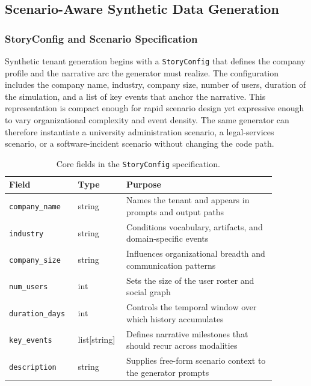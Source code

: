 \subsection{Scenario-Aware Synthetic Data Generation}
\label{sec:method_generation}

\subsubsection{StoryConfig and Scenario Specification}

Synthetic tenant generation begins with a \texttt{StoryConfig} that defines the company profile and the narrative arc the generator must realize. The configuration includes the company name, industry, company size, number of users, duration of the simulation, and a list of key events that anchor the narrative. This representation is compact enough for rapid scenario design yet expressive enough to vary organizational complexity and event density. The same generator can therefore instantiate a university administration scenario, a legal-services scenario, or a software-incident scenario without changing the code path.

\begin{table}[t]
\centering
\caption{Core fields in the \texttt{StoryConfig} specification.}
\label{tab:storyconfig_fields}
\small
\begin{tabular}{p{0.22\linewidth}p{0.14\linewidth}p{0.52\linewidth}}
\toprule
\textbf{Field} & \textbf{Type} & \textbf{Purpose} \\
\midrule
\texttt{company\_name} & string & Names the tenant and appears in prompts and output paths \\
\texttt{industry} & string & Conditions vocabulary, artifacts, and domain-specific events \\
\texttt{company\_size} & string & Influences organizational breadth and communication patterns \\
\texttt{num\_users} & int & Sets the size of the user roster and social graph \\
\texttt{duration\_days} & int & Controls the temporal window over which history accumulates \\
\texttt{key\_events} & list[string] & Defines narrative milestones that should recur across modalities \\
\texttt{description} & string & Supplies free-form scenario context to the generator prompts \\
\bottomrule
\end{tabular}

\end{table}

